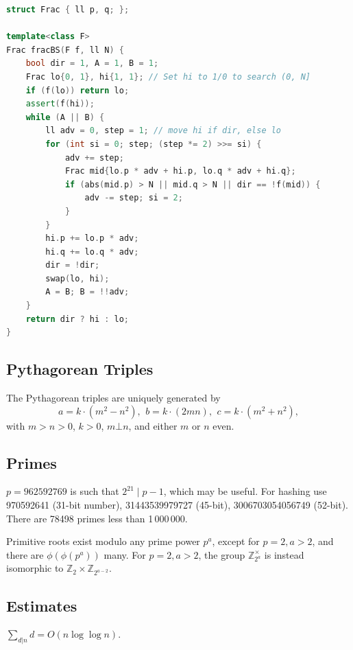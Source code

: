 \begin{multicols}{\Columns}
\begin{lstlisting}[language=C++]
struct Frac { ll p, q; };

template<class F>
Frac fracBS(F f, ll N) {
	bool dir = 1, A = 1, B = 1;
	Frac lo{0, 1}, hi{1, 1}; // Set hi to 1/0 to search (0, N]
	if (f(lo)) return lo;
	assert(f(hi));
	while (A || B) {
		ll adv = 0, step = 1; // move hi if dir, else lo
		for (int si = 0; step; (step *= 2) >>= si) {
			adv += step;
			Frac mid{lo.p * adv + hi.p, lo.q * adv + hi.q};
			if (abs(mid.p) > N || mid.q > N || dir == !f(mid)) {
				adv -= step; si = 2;
			}
		}
		hi.p += lo.p * adv;
		hi.q += lo.q * adv;
		dir = !dir;
		swap(lo, hi);
		A = B; B = !!adv;
	}
	return dir ? hi : lo;
}
\end{lstlisting}


\subsection{Pythagorean Triples}
 The Pythagorean triples are uniquely generated by
 \[ a=k\cdot (m^{2}-n^{2}),\ \,b=k\cdot (2mn),\ \,c=k\cdot (m^{2}+n^{2}), \]
 with $m > n > 0$, $k > 0$, $m \bot n$, and either $m$ or $n$ even.

\subsection{Primes}
	$p=962592769$ is such that $2^{21} \mid p-1$, which may be useful. For hashing
	use 970592641 (31-bit number), 31443539979727 (45-bit), 3006703054056749
	(52-bit). There are 78498 primes less than 1\,000\,000.

	Primitive roots exist modulo any prime power $p^a$, except for $p = 2, a > 2$, and there are $\phi(\phi(p^a))$ many.
	For $p = 2, a > 2$, the group $\mathbb Z_{2^a}^\times$ is instead isomorphic to $\mathbb Z_2 \times \mathbb Z_{2^{a-2}}$.

\subsection{Estimates}
	$\sum_{d|n} d = O(n \log \log n)$.


\end{multicols}
